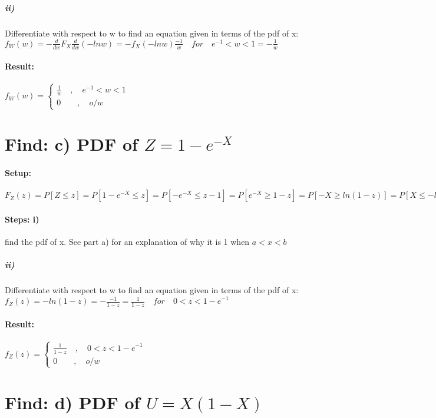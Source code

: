 \subparagraph{ii)}Differentiate with respect to w to find an equation given in terms of the pdf of x:\\ ${ f }_{ W }(w)= -\frac { d }{ dw } { F }_{ X }\frac { d }{ dw}(-lnw) = -{ f }_{ X }(-lnw)\frac{-1}{w} \quad for \quad {e}^{-1}<w<1=-\frac{1}{w}$

\paragraph{Result:} ${ f }_{ W }(w)=\begin{cases} \frac{ 1 }{w} \quad ,\quad {e}^{-1}<w<1 \\ 0\quad  \quad ,\quad o/w \end{cases}$

\section*{Find: c) PDF of $Z=1-{e}^{-X}$ }

\paragraph{Setup:} ${ F }_{ Z }(z)=P[Z\le z]=P[1-{e}^{-X}\le z]=P[-{e}^{-X}\le z-1]=P[{e}^{-X}\ge 1-z]= P[-X\ge ln(1-z)]=P[X\le -ln(1-z)]={F}_{x}(-ln(1-z))$

\paragraph{Steps: i)} find the pdf of x. See part a) for an explanation of why it is 1 when $a<x<b$


\subparagraph{ii)}Differentiate with respect to w to find an equation given in terms of the pdf of x:\\ ${ f }_{ Z }(z)= -ln(1-z)=-\frac { -1 }{1-z}=\frac{1}{1-z} \quad for \quad 0<z<{1-e}^{-1}$

\paragraph{Result:} ${ f }_{ Z }(z)=\begin{cases} \frac{ 1 }{1-z} \quad ,\quad 0<z<{1-e}^{-1} \\ 0\quad  \quad ,\quad o/w \end{cases}$

\section*{Find: d) PDF of $U=X(1-X)$ }

